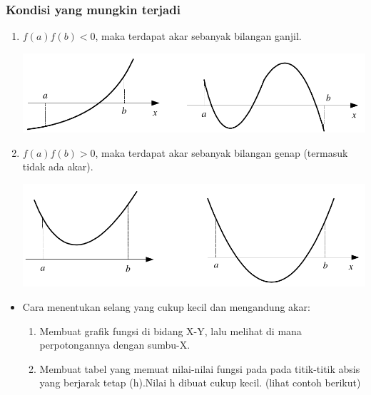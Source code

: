 \documentclass[pdflatex,compress]{beamer}
\begin{document}
\begin{frame}
	\frametitle{Kondisi yang mungkin terjadi}
	\begin{enumerate}
		\item $ f(a)f(b) < 0 $, maka terdapat akar sebanyak bilangan ganjil.
		\begin{center}
			\includegraphics[width=0.8\linewidth]{img/img02}
		\end{center}
		\item $ f(a)f(b) > 0 $, maka terdapat akar sebanyak bilangan genap (termasuk tidak ada akar).
		\begin{center}
			\includegraphics[width=0.8\linewidth]{img/img03}
		\end{center}
	\end{enumerate}
\end{frame}

\begin{frame}
	\begin{itemize}
		\item Cara menentukan selang yang cukup kecil dan mengandung akar:
		\begin{enumerate}
			\item Membuat grafik fungsi di bidang X-Y, lalu melihat di mana perpotongannya dengan sumbu-X.
			\item Membuat tabel yang memuat nilai-nilai fungsi pada pada titik-titik absis yang berjarak tetap (h).Nilai h dibuat cukup kecil. (lihat contoh berikut)
		\end{enumerate}
	\end{itemize}
\end{frame}
\end{document}
